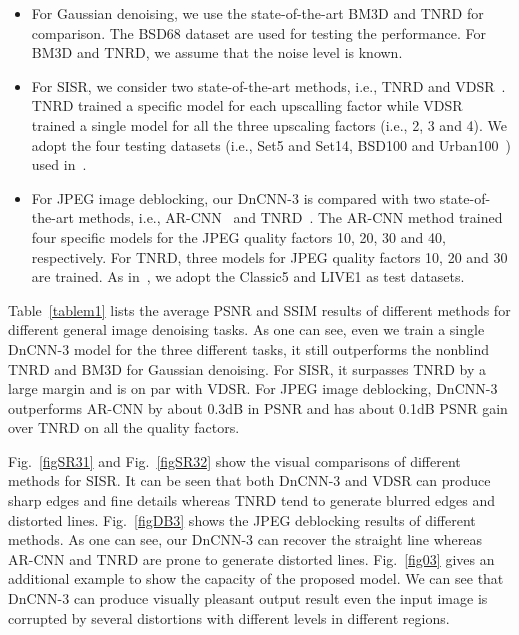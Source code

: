 \documentclass[journal]{IEEEtran}
\begin{document}
\begin{itemize}
  \item For Gaussian denoising, we use the state-of-the-art BM3D and TNRD for comparison. The BSD68 dataset are used for testing the performance. For BM3D and TNRD, we assume that the noise level is known.
  \item For SISR, we consider two state-of-the-art methods, i.e., TNRD and VDSR~\cite{kim2015accurate}.
    TNRD trained a specific model for each upscalling factor while VDSR~\cite{kim2015accurate} trained a single model for all the three upscaling factors (i.e., 2, 3 and 4). We adopt the four testing datasets (i.e., Set5 and Set14, BSD100 and Urban100~\cite{huang2015single}) used in~\cite{kim2015accurate}.
   \item For JPEG image deblocking, our DnCNN-3 is compared with two state-of-the-art methods, i.e., AR-CNN~\cite{dong2015compression} and TNRD~\cite{chen2015trainable}. The AR-CNN method trained four specific models
    for the JPEG quality factors 10, 20, 30 and 40, respectively. For TNRD, three models for JPEG quality factors
    10, 20 and 30 are trained. As in~\cite{dong2015compression}, we adopt the Classic5 and LIVE1 as test datasets.
\end{itemize}


Table~\ref{tablem1} lists the average PSNR and SSIM results of different methods for different general image denoising tasks.
As one can see, even we train a single DnCNN-3 model for the three different tasks, it still outperforms the nonblind TNRD and BM3D for Gaussian denoising. For SISR, it surpasses TNRD by a large margin and is on par with VDSR. For JPEG image deblocking, DnCNN-3 outperforms AR-CNN by about 0.3dB in PSNR and has about 0.1dB PSNR gain over TNRD on all the quality factors.


Fig.~\ref{figSR31} and Fig.~\ref{figSR32} show the visual comparisons of different methods for SISR. It can be seen that both DnCNN-3 and VDSR can produce sharp edges and fine details whereas TNRD tend to generate blurred edges and distorted lines. Fig.~\ref{figDB3} shows the JPEG deblocking results of different methods. As one can see, our DnCNN-3 can recover the straight line whereas AR-CNN and TNRD are prone to generate distorted lines. Fig.~\ref{fig03} gives an additional example to show the capacity of the proposed model. We can see that DnCNN-3 can produce visually pleasant output result even the input image is corrupted by several distortions with different levels in different regions.
\end{document}
